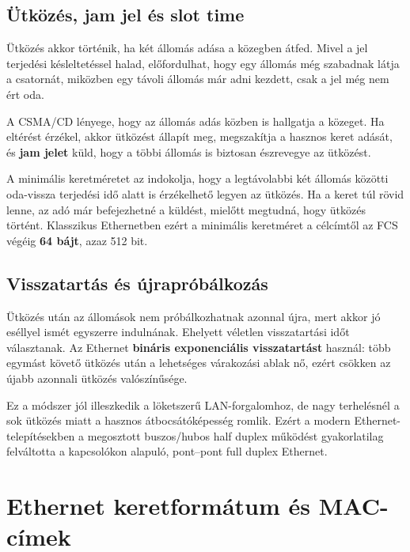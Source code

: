 

\subsection{Ütközés, jam jel és slot time}

Ütközés akkor történik, ha két állomás adása a közegben átfed. Mivel a jel terjedési késleltetéssel halad, előfordulhat, hogy egy állomás még szabadnak látja a csatornát, miközben egy távoli állomás már adni kezdett, csak a jel még nem ért oda.

A CSMA/CD lényege, hogy az állomás adás közben is hallgatja a közeget. Ha eltérést érzékel, akkor ütközést állapít meg, megszakítja a hasznos keret adását, és \textbf{jam jelet} küld, hogy a többi állomás is biztosan észrevegye az ütközést.

A minimális keretméretet az indokolja, hogy a legtávolabbi két állomás közötti oda-vissza terjedési idő alatt is érzékelhető legyen az ütközés. Ha a keret túl rövid lenne, az adó már befejezhetné a küldést, mielőtt megtudná, hogy ütközés történt. Klasszikus Ethernetben ezért a minimális keretméret a célcímtől az FCS végéig \textbf{64 bájt}, azaz 512 bit.



\subsection{Visszatartás és újrapróbálkozás}

Ütközés után az állomások nem próbálkozhatnak azonnal újra, mert akkor jó eséllyel ismét egyszerre indulnának. Ehelyett véletlen visszatartási időt választanak. Az Ethernet \textbf{bináris exponenciális visszatartást} használ: több egymást követő ütközés után a lehetséges várakozási ablak nő, ezért csökken az újabb azonnali ütközés valószínűsége.

Ez a módszer jól illeszkedik a löketszerű LAN-forgalomhoz, de nagy terhelésnél a sok ütközés miatt a hasznos átbocsátóképesség romlik. Ezért a modern Ethernet-telepítésekben a megosztott buszos/hubos half duplex működést gyakorlatilag felváltotta a kapcsolókon alapuló, pont--pont full duplex Ethernet.

\section{Ethernet keretformátum és MAC-címek}

